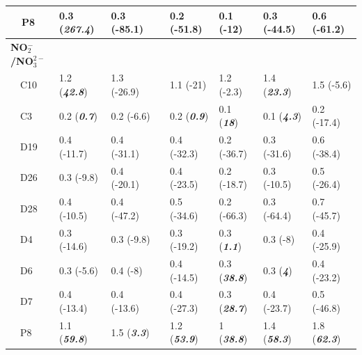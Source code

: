 \documentclass[letterpaper,12pt,oneside]{article}\usepackage[]{graphicx}\usepackage[]{color}
\begin{document}
\begin{table}[!tbp]
\begin{center}
\begin{tabular}{lllcllll}
~~P8&0.3 \footnotesize{(\textit{\textbf{267.4}})}&0.3 \footnotesize{(-85.1)}&&0.2 \footnotesize{(-51.8)}&0.1 \footnotesize{(-12)}&0.3 \footnotesize{(-44.5)}&0.6 \footnotesize{(-61.2)}\tabularnewline
\hline
{\bfseries NO$_{2}^{-}$/NO$_{3}^{2-}$}&&&&&&&\tabularnewline
~~C10&1.2 \footnotesize{(\textit{\textbf{42.8}})}&1.3 \footnotesize{(-26.9)}&&1.1 \footnotesize{(-21)}&1.2 \footnotesize{(-2.3)}&1.4 \footnotesize{(\textit{\textbf{23.3}})}&1.5 \footnotesize{(-5.6)}\tabularnewline
~~C3&0.2 \footnotesize{(\textit{\textbf{0.7}})}&0.2 \footnotesize{(-6.6)}&&0.2 \footnotesize{(\textit{\textbf{0.9}})}&0.1 \footnotesize{(\textit{\textbf{18}})}&0.1 \footnotesize{(\textit{\textbf{4.3}})}&0.2 \footnotesize{(-17.4)}\tabularnewline
~~D19&0.4 \footnotesize{(-11.7)}&0.4 \footnotesize{(-31.1)}&&0.4 \footnotesize{(-32.3)}&0.2 \footnotesize{(-36.7)}&0.3 \footnotesize{(-31.6)}&0.6 \footnotesize{(-38.4)}\tabularnewline
~~D26&0.3 \footnotesize{(-9.8)}&0.4 \footnotesize{(-20.1)}&&0.4 \footnotesize{(-23.5)}&0.2 \footnotesize{(-18.7)}&0.3 \footnotesize{(-10.5)}&0.5 \footnotesize{(-26.4)}\tabularnewline
~~D28&0.4 \footnotesize{(-10.5)}&0.4 \footnotesize{(-47.2)}&&0.5 \footnotesize{(-34.6)}&0.2 \footnotesize{(-66.3)}&0.3 \footnotesize{(-64.4)}&0.7 \footnotesize{(-45.7)}\tabularnewline
~~D4&0.3 \footnotesize{(-14.6)}&0.3 \footnotesize{(-9.8)}&&0.3 \footnotesize{(-19.2)}&0.3 \footnotesize{(\textit{\textbf{1.1}})}&0.3 \footnotesize{(-8)}&0.4 \footnotesize{(-25.9)}\tabularnewline
~~D6&0.3 \footnotesize{(-5.6)}&0.4 \footnotesize{(-8)}&&0.4 \footnotesize{(-14.5)}&0.3 \footnotesize{(\textit{\textbf{38.8}})}&0.3 \footnotesize{(\textit{\textbf{4}})}&0.4 \footnotesize{(-23.2)}\tabularnewline
~~D7&0.4 \footnotesize{(-13.4)}&0.4 \footnotesize{(-13.6)}&&0.4 \footnotesize{(-27.3)}&0.3 \footnotesize{(\textit{\textbf{28.7}})}&0.4 \footnotesize{(-23.7)}&0.5 \footnotesize{(-46.8)}\tabularnewline
~~P8&1.1 \footnotesize{(\textit{\textbf{59.8}})}&1.5 \footnotesize{(\textit{\textbf{3.3}})}&&1.2 \footnotesize{(\textit{\textbf{53.9}})}&1 \footnotesize{(\textit{\textbf{38.8}})}&1.4 \footnotesize{(\textit{\textbf{58.3}})}&1.8 \footnotesize{(\textit{\textbf{62.3}})}\tabularnewline
\hline
\end{tabular}\end{center}

\end{table}
\end{document}
